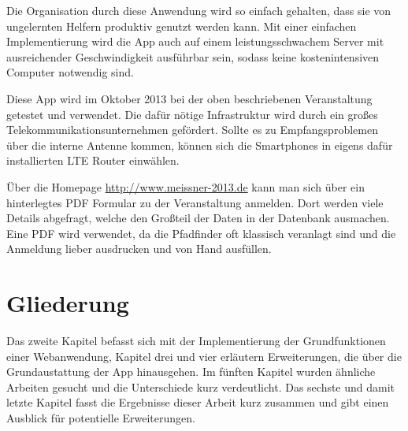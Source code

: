 Die Organisation durch diese Anwendung wird so einfach gehalten, dass sie von ungelernten Helfern produktiv genutzt werden kann. Mit einer einfachen Implementierung wird die App auch auf einem leistungsschwachem Server mit ausreichender Geschwindigkeit ausführbar sein, sodass keine kostenintensiven Computer notwendig sind.\par

Diese App wird im Oktober 2013 bei der oben beschriebenen Veranstaltung getestet und verwendet. Die dafür nötige Infrastruktur wird durch ein großes Telekommunikationsunternehmen gefördert. Sollte es zu Empfangsproblemen über die interne Antenne kommen, können sich die Smartphones in eigens dafür installierten LTE Router einwählen.\par

Über die Homepage \url{http://www.meissner-2013.de} kann man sich über ein hinterlegtes PDF Formular zu der Veranstaltung anmelden. Dort werden viele Details abgefragt, welche den Großteil der Daten in der Datenbank ausmachen. Eine PDF wird verwendet, da die Pfadfinder oft klassisch veranlagt sind und die Anmeldung lieber ausdrucken und von Hand ausfüllen.

\section{Gliederung}
Das zweite Kapitel befasst sich mit der Implementierung der Grundfunktionen einer Webanwendung, Kapitel drei und vier erläutern Erweiterungen, die über die Grundaustattung der App hinausgehen. Im fünften Kapitel wurden ähnliche Arbeiten gesucht und die Unterschiede kurz verdeutlicht. Das sechste und damit letzte Kapitel fasst die Ergebnisse dieser Arbeit kurz zusammen und gibt einen Ausblick für potentielle Erweiterungen. 